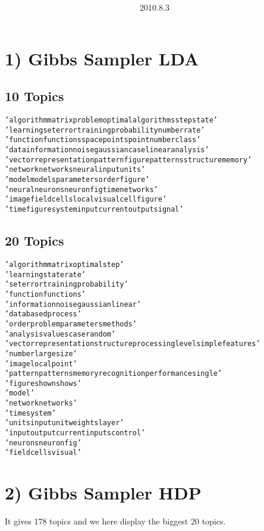 \documentclass{article}
\title{\vspace{0.3in}\textmd{\textbf{\hmwkTitle}}}
\date{2010.8.3}
\author{\textbf{\hmwkAuthorName}}
\begin{document}
\begin{spacing}{1.1}
\maketitle
\section{1) Gibbs Sampler LDA}
\subsection{10 Topics}
\begin{alltt}
    'algorithm matrix problem optimal algorithms step state'
    'learning set error training probability number rate'
    'function functions space points point number class'
    'data information noise gaussian case linear analysis'
    'vector representation pattern figure patterns structure memory'
    'network networks neural input units'
    'model models parameters order figure'
    'neural neurons neuron fig time networks'
    'image field cells local visual cell figure'
    'time figure system input current output signal'

\end{alltt}

\subsection{20 Topics}
\begin{alltt}
    'algorithm matrix optimal step'
    'learning state rate'
    'set error training probability'
    'function functions'
    'information noise gaussian linear'
    'data based process'
    'order problem parameters methods'
    'analysis values case random'
    'vector representation structure processing level simple features'
    'number large size'
    'image local point'
    'pattern patterns memory recognition performance single'
    'figure shown shows'
    'model'
    'network networks'
    'time system'
    'units input unit weights layer'
    'input output current inputs control'
    'neurons neuron fig'
    'field cells visual'
\end{alltt}

\section{2) Gibbs Sampler HDP}
It gives 178 topics and we here display the biggest 20 topics.

\end{spacing}
\end{document}
